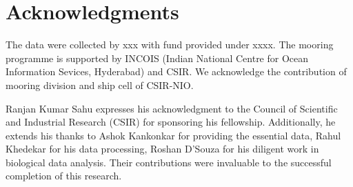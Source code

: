 \documentclass{article}
\begin{document}
	\section{Acknowledgments} 
	The data were collected by xxx with fund provided under xxxx. The mooring programme is supported by INCOIS (Indian National Centre for Ocean Information Sevices, Hyderabad) and CSIR. We acknowledge the contribution of mooring division and ship cell of CSIR-NIO. 
	
	Ranjan Kumar Sahu expresses his acknowledgment to the Council of Scientific and Industrial Research (CSIR) for sponsoring his fellowship. Additionally, he extends his thanks to Ashok Kankonkar for providing the essential data, Rahul Khedekar for his data processing, Roshan D'Souza for his diligent work in biological data analysis. Their contributions were invaluable to the successful completion of this research.


\linespread{1.5}	
{\footnotesize 	 %
}	

\newpage
{} 
\end{document}
